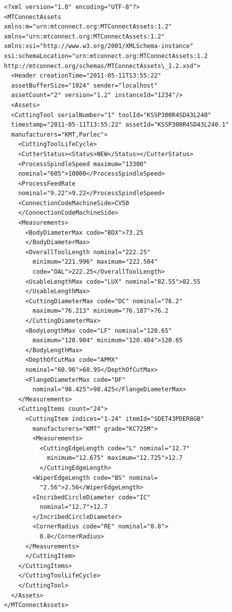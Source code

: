 \documentclass{mtconnect}	%
\begin{document}
\begin{lstlisting}[firstnumber=1,escapechar=|,% 
caption={Example for Indexable Insert Measurements}, label={lst:indexable-insert-measurements}]
<?xml version="1.0" encoding="UTF-8"?>
<MTConnectAssets 
xmlns:m="urn:mtconnect.org:MTConnectAssets:1.2" 
xmlns="urn:mtconnect.org:MTConnectAssets:1.2" 
xmlns:xsi="http://www.w3.org/2001/XMLSchema-instance" 
xsi:schemaLocation="urn:mtconnect.org:MTConnectAssets:1.2
http://mtconnect.org/schemas/MTConnectAssets\_1.2.xsd">
  <Header creationTime="2011-05-11T13:55:22" 
  assetBufferSize="1024" sender="localhost"
  assetCount="2" version="1.2" instanceId="1234"/>
  <Assets>
  <CuttingTool serialNumber="1" toolId="KSSP300R4SD43L240" 
  timestamp="2011-05-11T13:55:22" assetId="KSSP300R4SD43L240.1" 
  manufacturers="KMT,Parlec">
    <CuttingToolLifeCycle>
    <CutterStatus><Status>NEW</Status></CutterStatus>
    <ProcessSpindleSpeed maximum="13300" 
    nominal="605">10000</ProcessSpindleSpeed>
    <ProcessFeedRate
    nominal="9.22">9.22</ProcessSpindleSpeed>
    <ConnectionCodeMachineSide>CV50
    </ConnectionCodeMachineSide>
    <Measurements>
      <BodyDiameterMax code="BDX">73.25
      </BodyDiameterMax>
      <OverallToolLength nominal="222.25" 
        minimum="221.996" maximum="222.504" 
        code="OAL">222.25</OverallToolLength>
      <UsableLengthMax code="LUX" nominal="82.55">82.55
      </UsableLengthMax>
      <CuttingDiameterMax code="DC" nominal="76.2" 
        maximum="76.213" minimum="76.187">76.2
      </CuttingDiameterMax>
      <BodyLengthMax code="LF" nominal="120.65" 
        maximum="120.904" minimum="120.404">120.65
      </BodyLengthMax>
      <DepthOfCutMax code="APMX" 
      nominal="60.96">60.95</DepthOfCutMax>
      <FlangeDiameterMax code="DF" 
        nominal="98.425">98.425</FlangeDiameterMax>
    </Measurements>
    <CuttingItems count="24">
      <CuttingItem indices="1-24" itemId="SDET43PDER8GB" 
        manufacturers="KMT" grade="KC725M">
        <Measurements>
          <CuttingEdgeLength code="L" nominal="12.7" 
            minimum="12.675" maximum="12.725">12.7
          </CuttingEdgeLength>
        <WiperEdgeLength code="BS" nominal=
          "2.56">2.56</WiperEdgeLength>
        <IncribedCircleDiameter code="IC"
          nominal="12.7">12.7
        </IncribedCircleDiameter>
        <CornerRadius code="RE" nominal="0.8">
          0.8</CornerRadius>
      </Measurements>
      </CuttingItem>
    </CuttingItems>
    </CuttingToolLifeCycle>
    </CuttingTool>
  </Assets>
</MTConnectAssets>
\end{lstlisting}
\end{document}

